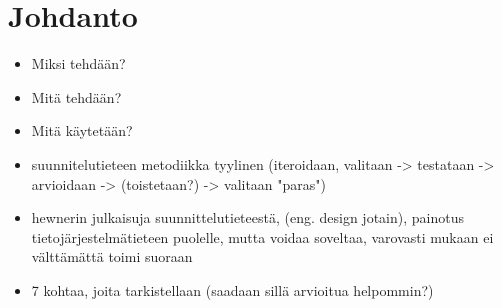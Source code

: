\chapter{Johdanto}%
\label{ch:johdanto}

\begin{itemize}
  \item Miksi tehdään?
  \item Mitä tehdään?
  \item Mitä käytetään?
  \item suunnitelutieteen metodiikka tyylinen (iteroidaan, valitaan -> testataan -> arvioidaan -> (toistetaan?) -> valitaan "paras")
  \item hewnerin julkaisuja suunnittelutieteestä, (eng. design jotain), painotus tietojärjestelmätieteen puolelle, mutta voidaa soveltaa, varovasti mukaan ei välttämättä toimi suoraan
  \item 7 kohtaa, joita tarkistellaan (saadaan sillä arvioitua helpommin?)
\end{itemize}

